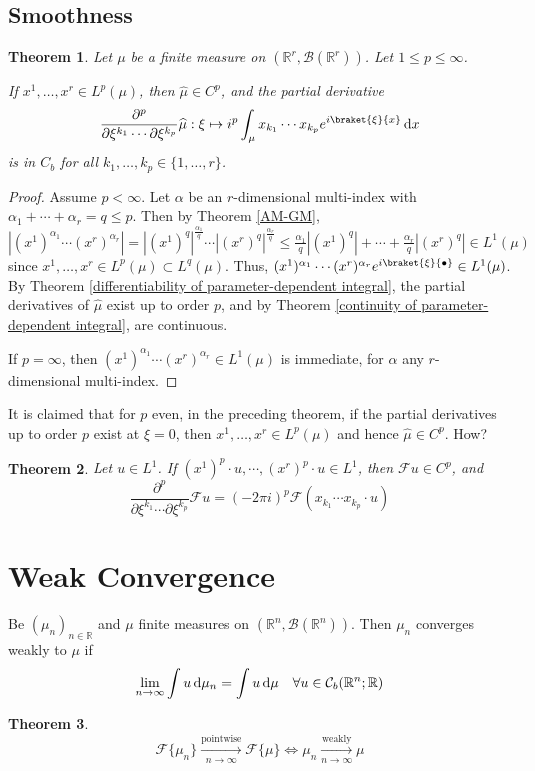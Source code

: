 \documentclass[11pt, a4paper, openany]{book}
\newtheorem{thm}{Theorem}\newtheorem{lem}{Lemma}\newtheorem{crl}{Corollary}
\theoremstyle{definition}
\begin{document}
\subsection{Smoothness}
    \begin{thm}
        Let $\mu$ be a finite measure on $(\mathbb{R}^r,\mathscr{B}(\mathbb{R}^r))$. Let $1\leqslant p\leqslant \infty$.
        
        If $x^1,\dots,x^r\in L^p(\mu)$, then $\widehat{\mu}\in C^p$, and the partial derivative
        \[
            \frac{\partial^p}{\partial \xi^{k_1}\cdots\partial \xi^{k_p}}\widehat{\mu}:\xi\mapsto i^p\int_\mu x_{k_1}\cdots x_{k_p}e^{i\braket{\xi}{x}}\odif x
        \]
        is in $C_b$ for all $k_1,\dots,k_p\in\{1,\dots,r\}$.
    \end{thm}
    \begin{proof}
        Assume $p<\infty$. Let $\alpha$ be an $r$-dimensional multi-index with $\alpha_1+\cdots+\alpha_r=q\leqslant p$. Then by Theorem \ref{AM-GM}, $|(x^1)^{\alpha_1}\cdots (x^r)^{\alpha_r}|=|(x^1)^q|^{\frac{\alpha_1}{q}}\cdots |(x^r)^q|^{\frac{\alpha_r}{q}}\leqslant \frac{\alpha_1}{q}|(x^1)^q|+\cdots+\frac{\alpha_r}{q}|(x^r)^q|\in L^1(\mu)$ since $x^1,\dots,x^r\in L^p(\mu)\subset L^q(\mu)$. Thus, $(x^1)^{\alpha_1}\cdots (x^r)^{\alpha_r}e^{i\braket{\xi}{\bullet}}\in L^1(\mu)$. By Theorem \ref{differentiability of parameter-dependent integral}, the partial derivatives of $\widehat{\mu}$ exist up to order $p$, and by Theorem \ref{continuity of parameter-dependent integral}, are continuous.

        If $p=\infty$, then $(x^1)^{\alpha_1}\cdots (x^r)^{\alpha_r}\in L^1(\mu)$ is immediate, for $\alpha$ any $r$-dimensional multi-index.
    \end{proof}
    It is claimed that for $p$ even, in the preceding theorem, if the partial derivatives up to order $p$ exist at $\xi =0$, then $x^1,\dots,x^r\in L^p(\mu)$ and hence $\widehat{\mu}\in C^p$. How?
    \begin{thm}
        Let $u\in L^1$. If $(x^1)^p\cdot u,\cdots,(x^r)^p\cdot u\in L^1$, then $\mathcal{F}u\in C^p$, and
        \[
            \frac{\partial^p}{\partial \xi^{k_1}\cdots\partial \xi^{k_p}}\mathcal{F}u=(-2\pi i)^p\mathcal{F}(x_{k_1}\cdots x_{k_p}\cdot u)
        \]
    \end{thm}
\section{Weak Convergence}
    Be $(\mu_n)_{n\in\mathbb{R}}$ and $\mu$ finite measures on $(\mathbb{R}^n,\mathscr{B}(\mathbb{R}^n))$. Then $\mu_n$ converges weakly to $\mu$ if
    \[\lim_{n\to\infty}\int u\odif{\mu_n}=\int u\odif{\mu}\quad\forall u\in \mathcal{C}_b(\mathbb{R}^n;\mathbb{R})\] 
    \begin{thm}
        \[\mathcal{F}\{\mu_n\}\xrightarrow[n\to\infty]{\text{pointwise}}\mathcal{F}\{\mu\}\Longleftrightarrow \mu_n\xrightarrow[n\to\infty]{\text{weakly}}\mu\]
    \end{thm}
\end{document}
